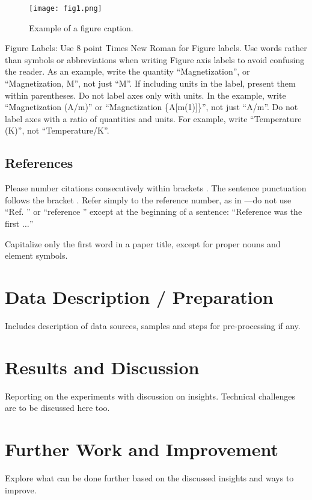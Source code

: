 \documentclass[conference]{IEEEtran}
\begin{document}
\begin{figure}[htbp]
\centerline{\texttt{[image: fig1.png]}}
\caption{Example of a figure caption.}
\label{fig}
\end{figure}

Figure Labels: Use 8 point Times New Roman for Figure labels. Use words 
rather than symbols or abbreviations when writing Figure axis labels to 
avoid confusing the reader. As an example, write the quantity 
``Magnetization'', or ``Magnetization, M'', not just ``M''. If including 
units in the label, present them within parentheses. Do not label axes only 
with units. In the example, write ``Magnetization (A/m)'' or ``Magnetization 
\{A[m(1)]\}'', not just ``A/m''. Do not label axes with a ratio of 
quantities and units. For example, write ``Temperature (K)'', not 
``Temperature/K''.

\subsection{References}

Please number citations consecutively within brackets \cite{b1}. The 
sentence punctuation follows the bracket \cite{b2}. Refer simply to the reference 
number, as in \cite{b3}---do not use ``Ref. \cite{b3}'' or ``reference \cite{b3}'' except at 
the beginning of a sentence: ``Reference \cite{b3} was the first $\ldots$''

Capitalize only the first word in a paper title, except for proper nouns and 
element symbols.

\section{Data Description / Preparation}
{\color{blue}Includes description of data sources, samples and steps for pre-processing if any.}

\section{Results and Discussion}
{\color{blue}Reporting on the experiments with discussion on insights. Technical challenges are to be discussed here too.}

\section{Further Work and Improvement}
{\color{blue}Explore what can be done further based on the discussed insights and ways to improve.}
\end{document}
